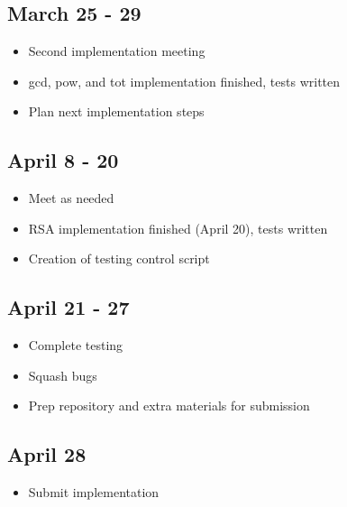 \documentclass{article}
\begin{document}
    \subsection{March 25 - 29}
         \begin{itemize}
            \item Second implementation meeting
            \item gcd, pow, and tot implementation finished, tests written
            \item Plan next implementation steps
        \end{itemize}
    \subsection{April 8 - 20}
        \begin{itemize}
            \item Meet as needed
            \item RSA implementation finished (April 20), tests written
            \item Creation of testing control script
        \end{itemize}
    \subsection{April 21 - 27}
        \begin{itemize}
            \item Complete testing
            \item Squash bugs
            \item Prep repository and extra materials for submission
        \end{itemize}
    \subsection{April 28}
        \begin{itemize}
            \item Submit implementation
        \end{itemize}
\newpage

\end{document}
